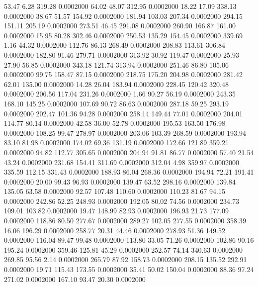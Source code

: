   53.47    6.28  319.28   0.0002000
  64.02   48.07  312.95   0.0002000
  18.22   17.09  338.13   0.0002000
  38.67   51.57  154.92   0.0002000
 181.94  103.03  207.34   0.0002000
 294.15  151.11  205.19   0.0002000
 273.51   46.45  291.08   0.0002000
 260.90  166.87  161.00   0.0002000
  15.95   80.28  302.46   0.0002000
 250.53  135.29  154.45   0.0002000
 339.69    1.16   44.32   0.0002000
 112.76   86.13  268.49   0.0002000
 208.83  113.61  306.84   0.0002000
 182.80   91.46  279.71   0.0002000
 313.92   30.92  119.47   0.0002000
  25.93   27.90   56.85   0.0002000
 343.18  121.74  313.94   0.0002000
 251.46   86.80  105.06   0.0002000
  99.75  158.47   87.15   0.0002000
 218.75  175.20  204.98   0.0002000
 281.42   62.01  135.00   0.0002000
  14.28   26.04  183.94   0.0002000
 228.45  120.42  320.48   0.0002000
 206.56  117.04  231.26   0.0002000
   1.66   90.27   56.19   0.0002000
 243.35  168.10  145.25   0.0002000
 107.69   90.72   86.63   0.0002000
 287.18   59.25  293.19   0.0002000
 202.47  101.36   94.28   0.0002000
 258.14  149.44   77.01   0.0002000
 204.01  114.77   80.14   0.0002000
  42.58   36.00   52.78   0.0002000
 195.53  163.50  176.98   0.0002000
 108.25   99.47  278.97   0.0002000
 203.06  103.39  268.59   0.0002000
 193.94   83.10   81.98   0.0002000
 174.02   69.36  131.19   0.0002000
 172.66  121.89  359.21   0.0002000
  94.82  112.77  305.65   0.0002000
 204.94   91.81   86.77   0.0002000
  57.40   21.54   43.24   0.0002000
 231.68  154.41  311.69   0.0002000
 312.04    4.98  359.97   0.0002000
 335.59  112.15  331.43   0.0002000
 188.93   86.04  268.36   0.0002000
 194.94   72.21  191.41   0.0002000
  20.00   99.43   96.93   0.0002000
 139.47   63.52  298.16   0.0002000
 139.84  135.05   63.58   0.0002000
  92.57  107.48  110.60   0.0002000
 110.23   81.67   94.15   0.0002000
 242.86   52.25  248.93   0.0002000
 192.05   80.02   74.56   0.0002000
 234.73  109.01  103.82   0.0002000
  19.47  148.99   82.93   0.0002000
 196.93   21.73  177.09   0.0002000
 118.86   80.50  277.67   0.0002000
 289.27  102.05  277.55   0.0002000
 358.39   16.06  196.29   0.0002000
 258.77   20.31   44.46   0.0002000
 278.93   51.36  149.52   0.0002000
 116.04   89.47   99.48   0.0002000
 113.80   33.05   71.26   0.0002000
 102.86   90.16  195.24   0.0002000
 359.46  125.81   45.29   0.0002000
 252.57   74.14  340.63   0.0002000
 269.85   95.56    2.14   0.0002000
 265.79   87.92  158.73   0.0002000
 208.15  135.52  292.91   0.0002000
  19.71  115.43  173.55   0.0002000
  35.41   50.02  150.04   0.0002000
  88.36   97.24  271.02   0.0002000
 167.10   93.47   20.30   0.0002000
